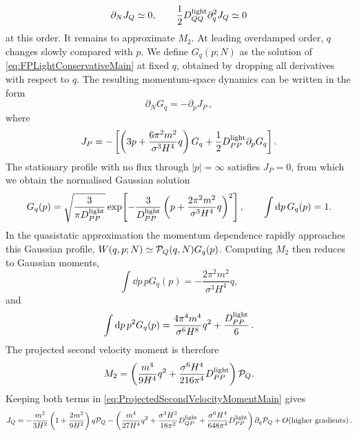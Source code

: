 \documentclass{article}
\numberwithin{equation}{section}
\begin{document}
	\begin{equation}
		\partial_NJ_Q\simeq0,
		\qquad
		\frac12D_{QQ}^{\rm light}\partial_q^2J_Q\simeq0
	\end{equation}
	at this order.
	It remains to approximate \(M_2\). At leading overdamped order, $q$ changes slowly compared with $p$. We define $G_q(p;N)$ as the solution of \cref{eq:FPLightConservativeMain} at fixed $q$, obtained by dropping all derivatives with respect to $q$. The resulting momentum-space dynamics can be written in the form
    \begin{equation}
    \partial_N G_q = -\partial_p J_P \, ,
    \label{eq:FastMomentumDynamicsMain}
    \end{equation}
 where
    \begin{equation}
    J_P = -\left[\left(3p+\frac{6\pi^2m^2}{\sigma^3H^4}q\right)G_q+\frac12D_{PP}^{\rm light}\partial_pG_q\right].
    \label{eq:MomentumCurrentMain}
    \end{equation}
    The stationary profile with no flux through $|p|=\infty$ satisfies $J_P=0$, from which we obtain the normalised Gaussian solution
	\begin{equation}
		G_q(p)
		=
		\sqrt{\frac{3}{\pi D_{PP}^{\rm light}}}
		\exp\!\left[
		-\frac{3}{D_{PP}^{\rm light}}
		\left(
		p+\frac{2\pi^2m^2}{\sigma^3H^4}q
		\right)^2
		\right],
		\qquad
		\int\dd p\,G_q(p)=1 .
		\label{eq:FastMomentumKernelMain}
	\end{equation}
	In the quasistatic approximation the momentum dependence rapidly approaches this Gaussian profile, \(W(q,p;N)\simeq{\cal P}_Q(q,N)G_q(p)\). Computing \(M_2\) then reduces to Gaussian moments,
	\begin{equation}
		\int \dd p\,pG_q(p)
		=
		-\frac{2\pi^2m^2}{\sigma^3H^4}q ,
		\label{eq:FastMomentumFirstMomentMain}
	\end{equation}
	and
	\begin{equation}
		\int \dd p\,p^2G_q(p)
		=
		\frac{4\pi^4m^4}{\sigma^6H^8}q^2
		+
		\frac{D_{PP}^{\rm light}}{6}\, .
		\label{eq:FastMomentumSecondMomentMain}
	\end{equation}
	The projected second velocity moment is therefore
	\begin{equation}
		M_2
		=
		\left(
		\frac{m^4}{9H^4}q^2
		+
		\frac{\sigma^6H^4}{216\pi^4}D_{PP}^{\rm light}
		\right)
		{\cal P}_Q .
		\label{eq:ProjectedSecondVelocityMomentMain}
	\end{equation}
	Keeping both terms in \cref{eq:ProjectedSecondVelocityMomentMain} gives
	\begin{equation}
		J_Q
		=
		-\frac{m^2}{3H^2}
		\left(
		1+\frac{2m^2}{9H^2}
		\right)
		q{\cal P}_Q
		-
		\left(
		\frac{m^4}{27H^4}q^2
		+
		\frac{\sigma^3H^2}{18\pi^2}D_{QP}^{\rm light}
		+
		\frac{\sigma^6H^4}{648\pi^4}D_{PP}^{\rm light}
		\right)
		\partial_q{\cal P}_Q
		+
		O\!\left(\text{higher gradients}\right).
		\label{eq:LightCurrentQuasistaticMain}
	\end{equation}
\end{document}
